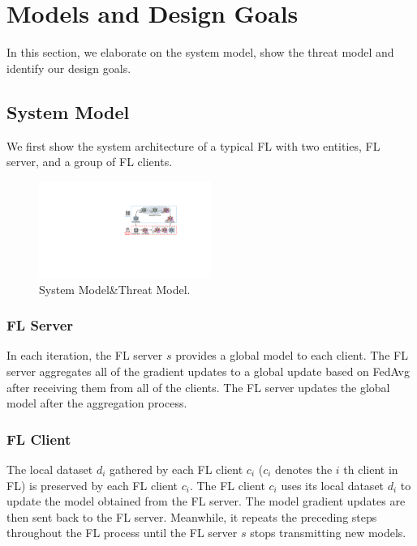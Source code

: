 \documentclass[journal]{IEEEtran}
\begin{document}
\section{Models and Design Goals}

In this section, we elaborate on the system model, show the threat model and identify our design goals.

\subsection{System Model}We first show the system architecture of a typical FL with two entities, FL server, and a group of FL clients.
  \begin{figure}
    \centering
  \includegraphics[width=0.5\textwidth]{figures/Figure_System.pdf}
  \caption{System Model\&Threat Model.}
  \label{fig_system}
  \end{figure}   
\subsubsection{{FL Server}} In each iteration, the FL server $s$ provides a global model to each client. The FL server aggregates all of the gradient updates to a global update based on FedAvg after receiving them from all of the clients. The FL server updates the global model after the aggregation process.

\subsubsection{{FL Client}} The local dataset $d_i$ gathered by each FL client $c_i$ ($c_i$ denotes the $i$ th client in FL) is preserved by each FL client $c_i$. The FL client $c_i$ uses its local dataset $d_i$ to update the model obtained from the FL server. The model gradient updates are then sent back to the FL server. Meanwhile, it repeats the preceding steps throughout the FL process until the FL server $s$ stops transmitting new models.
\end{document}
